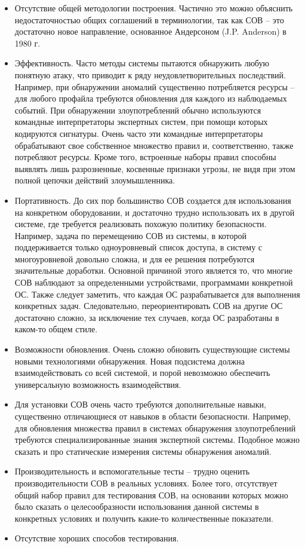 \begin{itemize}
	\item Отсутствие общей методологии построения. Частично это можно объяснить недостаточностью общих соглашений в терминологии, так как СОВ – это достаточно новое направление, основанное Андерсоном (J.P. Anderson) в 1980 г.
	\item Эффективность. Часто методы системы пытаются обнаружить любую понятную атаку, что приводит к ряду неудовлетворительных последствий. Например, при обнаружении аномалий существенно потребляется ресурсы – для любого профайла требуются обновления для каждого из наблюдаемых событий. При обнаружении злоупотреблений обычно используются командные интерпретаторы экспертных систем, при помощи которых кодируются сигнатуры. Очень часто эти командные интерпретаторы обрабатывают свое собственное множество правил и, соответственно, также потребляют ресурсы. Кроме того, встроенные наборы правил способны выявлять лишь разрозненные, косвенные признаки угрозы, не видя при этом полной цепочки действий злоумышленника.
	\item Портативность. До сих пор большинство СОВ создается для использования на конкретном оборудовании, и достаточно трудно использовать их в другой системе, где требуется реализовать похожую политику безопасности. Например, задача по перемещению СОВ из системы, в которой поддерживается только одноуровневый список доступа, в систему с многоуровневой довольно сложна, и для ее решения потребуются значительные доработки. Основной причиной этого является то, что многие СОВ наблюдают за определенными устройствами, программами конкретной ОС. Также следует заметить, что каждая ОС разрабатывается для выполнения конкретных задач. Следовательно, переориентировать СОВ на другие ОС достаточно сложно, за исключение тех случаев, когда ОС разработаны в каком-то общем стиле.
	\item Возможности обновления. Очень сложно обновить существующие системы новыми технологиями обнаружения. Новая подсистема должна взаимодействовать со всей системой, и порой невозможно обеспечить универсальную возможность взаимодействия.
	\item Для установки СОВ очень часто требуются дополнительные навыки, существенно отличающиеся от навыков в области безопасности. Например, для обновления множества правил в системах обнаружения злоупотреблений требуются специализированные знания экспертной системы. Подобное можно сказать и про статические измерения системы обнаружения аномалий.
	\item Производительность и вспомогательные тесты – трудно оценить производительности СОВ в реальных условиях. Более того, отсутствует общий набор правил для тестирования СОВ, на основании которых можно было сказать о целесообразности использования данной системы в конкретных условиях и получить какие-то количественные показатели.
	\item Отсутствие хороших способов тестирования.
	
\end{itemize}

